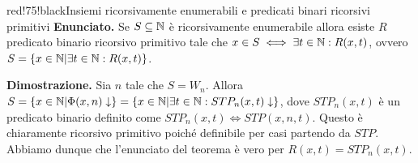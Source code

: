 \begin{halfframedbox}{red!75!black}{Insiemi ricorsivamente enumerabili e predicati binari ricorsivi primitivi}
\textbf{Enunciato. } Se \(S \subseteq \mathbb{N}\) è ricorsivamente enumerabile allora esiste \(R\) predicato binario ricorsivo primitivo tale che \(x \in S \iff \exists t \in \mathbb{N} : R(x,t)\), ovvero \(S=\displaystyle{\left\{{x \in \mathbb{N}\vert \exists t \in \mathbb{N}: R(x,t)}\right\}}\).
\begin{center}
  \textcolor{red!75!black}{\hdashrule[0.5ex]{18cm}{1pt}{3mm 3pt 1mm 2pt}}
\end{center}
\textbf{Dimostrazione. } Sia \(n\) tale che \(S=W_n\). Allora \(S=\displaystyle{\left\{{x \in \mathbb{N}\vert \Phi(x,n)\downarrow}\right\}} = \displaystyle{\left\{{x \in \mathbb{N}\vert \exists t \in \mathbb{N}: STP_n(x,t)\downarrow}\right\}}\), dove \(STP_n(x,t)\) è un predicato binario definito come \(STP_n(x,t) \iff STP(x,n,t)\). Questo è chiaramente ricorsivo primitivo poiché definibile per casi partendo da \(STP\). Abbiamo dunque che l'enunciato del teorema è vero per \(R(x,t)=STP_n(x,t)\).
\end{halfframedbox}

